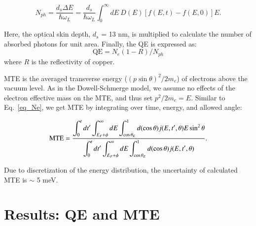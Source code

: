 	\begin{equation}\label{eq_Nph}
		N_{ph} = \frac{d_s \Delta E}{ \hbar \omega_L} = \frac{d_{s}}{\hbar \omega_L} \int_0^\infty dE \: D(E) [f(E,t)-f(E,0)] E.
	\end{equation}

Here, the optical skin depth, $d_s$ = 13 nm,\cite{CuRefl} is multiplied to calculate the number of absorbed photons for unit area. Finally, the QE is expressed as:
\begin{equation}\label{eq_qe}
	\textrm{QE} = N_e (1-R) / N_{ph}
\end{equation}
where $R$ is the reflectivity of copper.\cite{CuRefl}

MTE is the averaged transverse energy ($(p \sin\theta)^2/2m_e$) of electrons above the vacuum level. As in the Dowell-Schmerge model,  we assume no effects of the electron effective mass on the MTE, and thus  set $p^2/2m_e = E$. Similar to Eq.~\ref{eq_Ne}, we get MTE by integrating over time, energy, and allowed angle:

	\begin{equation}\label{eq_mte}
		\textmd{MTE} = \frac{\displaystyle \int_0^t dt' \int_{E_F+\phi}^{\infty} dE \int_{\cos\theta_E}^1 d(\cos\theta) j(E,t',\theta) E \sin^2\theta}{\displaystyle \int_0^t dt' \int_{E_F+\phi}^{\infty} dE \int_{\cos\theta_E}^1 d(\cos\theta) j(E,t',\theta)}.
	\end{equation}

Due to discretization of the energy distribution, the uncertainty of calculated MTE is $\sim$ 5 meV.

\section{Results: QE and MTE}

